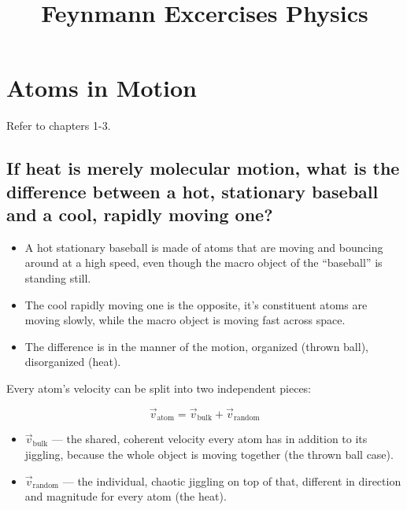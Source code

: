 \documentclass{article}
\title{Feynmann Excercises Physics
}
\begin{document}
\maketitle


\section{Atoms in Motion}
Refer to chapters 1-3.

\subsection{If heat is merely molecular motion, what is the difference between a hot, stationary baseball and a cool, rapidly moving one?}
\begin{itemize}
    \item A hot stationary baseball is made of atoms that are moving and bouncing around at a high speed, even though the macro object of the “baseball” is standing still.
    \item The cool rapidly moving one is the opposite, it’s constituent atoms are moving slowly, while the macro object is moving fast across space.
    \item The difference is in the manner of the motion, organized (thrown ball), disorganized (heat).
\end{itemize}

Every atom's velocity can be split into two independent pieces:

  $$\vec{v}_{\text{atom}} = \vec{v}_{\text{bulk}} + \vec{v}_{\text{random}}$$
\begin{itemize}
    \item $\vec{v}_{\text{bulk}}$ — the shared, coherent velocity every atom has in addition to its jiggling, because the whole object is moving together (the
    thrown ball case).
    \item $\vec{v}_{\text{random}}$ — the individual, chaotic jiggling on top of that, different in direction and magnitude for every atom (the heat).
\end{itemize}
\end{document}
